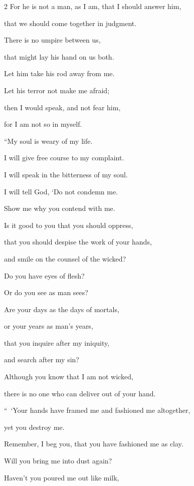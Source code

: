 \begin{multicols}{2}
	\myverse{}For he is not a man, as I am, that I should answer him,
	
	that we should come together in judgment.
	
	\myverse{}There is no umpire between us,
	
	that might lay his hand on us both.
	
	\myverse{}Let him take his rod away from me.
	
	Let his terror not make me afraid;
	
	\myverse{}then I would speak, and not fear him,
	
	for I am not so in myself.
	
	
	
	
	\mychapter{} \myverse*{}“My soul is weary of my life.
	
	\quad\quad I will give free course to my complaint.
	
	I will speak in the bitterness of my soul.
	
	\myverse{}I will tell God, ‘Do not condemn me.
	
	Show me why you contend with me.
	
	\myverse{}Is it good to you that you should oppress,
	
	that you should despise the work of your hands,
	
	and smile on the counsel of the wicked?
	
	\myverse{}Do you have eyes of flesh?
	
	Or do you see as man sees?
	
	\myverse{}Are your days as the days of mortals,
	
	or your years as man’s years,
	
	\myverse{}that you inquire after my iniquity,
	
	and search after my sin?
	
	\myverse{}Although you know that I am not wicked,
	
	there is no one who can deliver out of your hand.
	
	\vspace{\baselineskip}
	
	\myverse{}“ ‘Your hands have framed me and fashioned me altogether,
	
	yet you destroy me.
	
	\myverse{}Remember, I beg you, that you have fashioned me as clay.
	
	Will you bring me into dust again?
	
	\myverse{}Haven’t you poured me out like milk,
	

\end{multicols}
